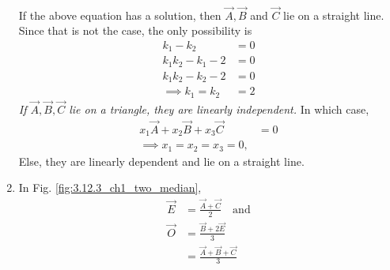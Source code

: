 \begin{enumerate}[label=\thesection.\arabic*.,ref=\thesection.\theenumi]
\begin{align}
\end{align}
%
If the above equation has a solution, then $\vec{A}, \vec{B}$ and $\vec{C}$ lie on a straight line.  Since that is not the case, the only possibility is 
\begin{align}
k_1-k_2 &= 0
\\
k_1k_2 -k_1 -2 &= 0
\\
k_1k_2 -k_2 -2 &= 0
\\
\implies k_1=k_2&=2
\end{align}
{\em If $\vec{A}, \vec{B}, \vec{C}$ lie on a triangle, they are linearly independent.}    In which case, 
\begin{align}
x_1\vec{A}+ x_2\vec{B}+x_3\vec{C} &= 0
\\
\implies x_1 = x_2=x_3 = 0,
\end{align}
Else, they are linearly dependent and lie on a straight line.
\item In Fig. \ref{fig:3.12.3_ch1_two_median},
\begin{align}
\vec{E} &=  \frac{\vec{A}+\vec{C}}{2} \quad \text{and}
\\
\vec{O}&= \frac{\vec{B}+2\vec{E}}{3}
\\
&= \frac{\vec{A}+\vec{B}+\vec{C}}{3}
\end{align}
\end{enumerate}
	
